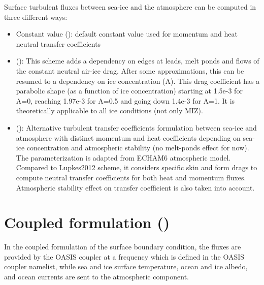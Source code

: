 \documentclass[../main/NEMO_manual]{subfiles}
\begin{document}
Surface turbulent fluxes between sea-ice and the atmosphere can be computed in three different ways:

\begin{itemize}
\item Constant value ():
  default constant value used for momentum and heat neutral transfer coefficients
\item \citet{lupkes.gryanik.ea_JGR12} ():
  This scheme adds a dependency on edges at leads, melt ponds and flows
  of the constant neutral air-ice drag. After some approximations,
  this can be resumed to a dependency on ice concentration (A).
  This drag coefficient has a parabolic shape (as a function of ice concentration)
  starting at 1.5e-3 for A=0, reaching 1.97e-3 for A=0.5 and going down 1.4e-3 for A=1.
  It is theoretically applicable to all ice conditions (not only MIZ).
\item \citet{lupkes.gryanik_JGR15} ():
  Alternative turbulent transfer coefficients formulation between sea-ice
  and atmosphere with distinct momentum and heat coefficients depending
  on sea-ice concentration and atmospheric stability (no melt-ponds effect for now).
  The parameterization is adapted from ECHAM6 atmospheric model.
  Compared to Lupkes2012 scheme, it considers specific skin and form drags
  to compute neutral transfer coefficients for both heat and momentum fluxes.
  Atmospheric stability effect on transfer coefficient is also taken into account.
\end{itemize}

\section[Coupled formulation (\textit{sbccpl.F90})]{Coupled formulation (\protect{})}
\label{sec:SBC_cpl}

\begin{listing}
  \caption{}
  \label{lst:namsbc_cpl}
\end{listing}

In the coupled formulation of the surface boundary condition,
the fluxes are provided by the OASIS coupler at a frequency which is defined in the OASIS coupler namelist,
while sea and ice surface temperature, ocean and ice albedo, and ocean currents are sent to
the atmospheric component.
\end{document}
